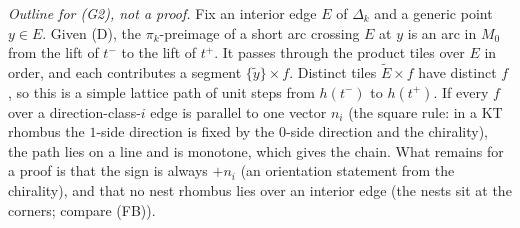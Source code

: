 \documentclass[11pt]{article}
\theoremstyle{definition}\newtheorem{definition}[theorem]{Definition}\newtheorem{remark}[theorem]{Remark}
\begin{document}
\emph{Outline for (G2), not a proof.} Fix an interior edge $E$ of $\Delta_k$ and a generic point $y\in E$. Given (D), the $\pi_k$-preimage of a short arc crossing $E$ at $y$ is an arc in $M_0$ from the lift of $t^-$ to the lift of $t^+$. It passes through the product tiles over $E$ in order, and each contributes a segment $\{\tilde y\}\times f$. Distinct tiles $\tilde E\times f$ have distinct $f$, so this is a simple lattice path of unit steps from $h(t^-)$ to $h(t^+)$. If every $f$ over a direction-class-$i$ edge is parallel to one vector $n_i$ (the square rule: in a KT rhombus the $1$-side direction is fixed by the $0$-side direction and the chirality), the path lies on a line and is monotone, which gives the chain. What remains for a proof is that the sign is always $+n_i$ (an orientation statement from the chirality), and that no nest rhombus lies over an interior edge (the nests sit at the corners; compare (FB)).
\end{document}
